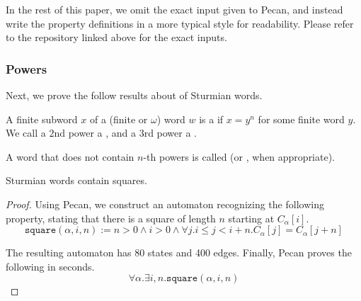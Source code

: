 In the rest of this paper, we omit the exact input given to Pecan, and instead write the property definitions in a more typical style for readability.
Please refer to the repository linked above for the exact inputs.

\subsubsection{Powers}


Next, we prove the follow results about  of Sturmian words.

\begin{definition}
    A finite subword $x$ of a (finite or $\omega$) word $w$ is a  if $x = y^n$ for some finite word $y$.
    We call a $2$nd power a , and a $3$rd power a .
    
    A word that does not contain $n$-th powers is called  (or ,  when appropriate).
\end{definition}

\begin{theorem}
    Sturmian words contain squares.
\end{theorem}
\begin{proof}
Using Pecan, we construct an automaton recognizing the following property, stating that there is a square of length $n$ starting at $C_{\alpha}[i]$.
\[
    \texttt{square}(\alpha, i, n) := n > 0 \land i > 0 \land \forall j. i \leq j < i + n. C_{\alpha}[j] = C_{\alpha}[j + n]
\]

The resulting automaton has 80 states and 400 edges.
Finally, Pecan proves the following in  seconds.
\[
    \forall \alpha. \exists i, n. \texttt{square}(\alpha, i, n)
\]
\end{proof}

